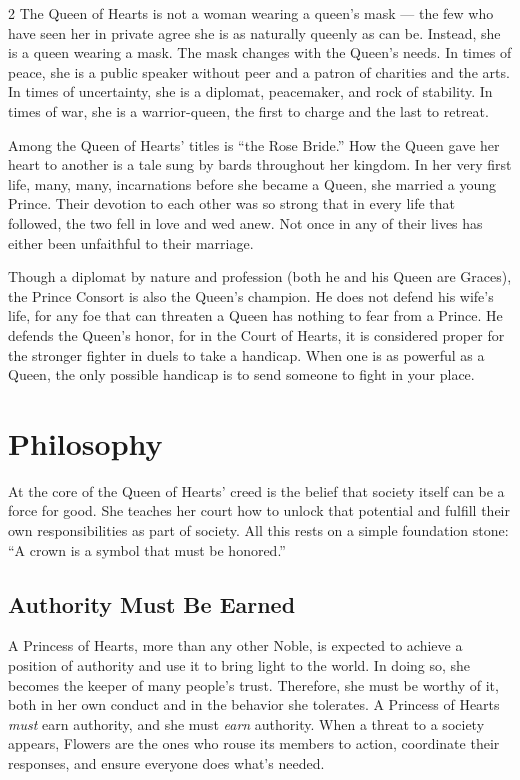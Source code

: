 \begin{multicols}{2}
The Queen of Hearts is not a woman wearing a queen's mask — the few who have seen her in private agree she is as naturally queenly as can be. Instead, she is a queen wearing a mask. The mask changes with the Queen's needs. In times of peace, she is a public speaker without peer and a patron of charities and the arts. In times of uncertainty, she is a diplomat, peacemaker, and rock of stability. In times of war, she is a warrior-queen, the first to charge and the last to retreat.

Among the Queen of Hearts' titles is “the Rose Bride.” How the Queen gave her heart to another is a tale sung by bards throughout her kingdom. In her very first life, many, many, incarnations before she became a Queen, she married a young Prince. Their devotion to each other was so strong that in every life that followed, the two fell in love and wed anew. Not once in any of their lives has either been unfaithful to their marriage. 

Though a diplomat by nature and profession (both he and his Queen are Graces), the Prince Consort is also the Queen's champion. He does not defend his wife's life, for any foe that can threaten a Queen has nothing to fear from a Prince. He defends the Queen's honor, for in the Court of Hearts, it is considered proper for the stronger fighter in duels to take a handicap. When one is as powerful as a Queen, the only possible handicap is to send someone to fight in your place.

\section*{Philosophy}

At the core of the Queen of Hearts' creed is the belief that society itself can be a force for good. She teaches her court how to unlock that potential and fulfill their own responsibilities as part of society. All this rests on a simple foundation stone: \textquotedblleft A crown is a symbol that must be honored.\textquotedblright

\subsection*{Authority Must Be Earned}

A Princess of Hearts, more than any other Noble, is expected to achieve a position of authority and use it to bring light to the world. In doing so, she becomes the keeper of many people's trust. Therefore, she must be worthy of it, both in her own conduct and in the behavior she tolerates. A Princess of Hearts \textit{must} earn authority, and she must \textit{earn} authority. When a threat to a society appears, Flowers are the ones who rouse its members to action, coordinate their responses, and ensure everyone does what's needed. 


\end{multicols}
